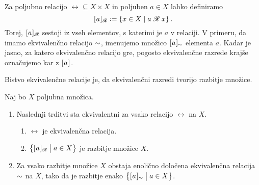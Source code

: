                 Za poljubno relacijo $\rel \subseteq X \times X$ in poljuben $a \in X$ lahko definiramo
                \[\ec[\rel]{a} \dfeq \set{x \in X}{\rel[a][x]}.\]
                Torej, $\ec[\rel]{a}$ sestoji iz vseh elementov, s katerimi je $a$ v relaciji. V primeru, da imamo ekvivalenčno relacijo $\equ$, imenujemo množico $\ec[\equ]{a}$  elementa $a$. Kadar je jasno, za katero ekvivalenčno relacijo gre, pogosto ekvivalenčne razrede krajše označujemo kar z $\ec{a}$.

                Bistvo ekvivalenčne relacije je, da ekvivalenčni razredi tvorijo razbitje množice.



                \begin{izrek}
                        Naj bo $X$ poljubna množica.
                        \begin{enumerate}
                                \item
                                        Naslednji trditvi sta ekvivalentni za vsako relacijo $\rel$ na $X$.
                                        \begin{enumerate}
                                                \item
                                                        $\rel$ je ekvivalenčna relacija.
                                                \item
                                                        $\set[1]{\ec[\rel]{a}}{a \in X}$ je razbitje množice $X$.
                                        \end{enumerate}
                                \item
                                        Za vsako razbitje množice $X$ obstaja enolično določena ekvivalenčna relacija $\equ$ na $X$, tako da je razbitje enako $\set[1]{\ec[\equ]{a}}{a \in X}$.
                        \end{enumerate}
                \end{izrek}

